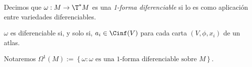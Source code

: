 \begin{ndef}
  Decimos que $\omega: M\to\T^{*}M$ es una \emph{1-forma diferenciable} si lo es como
  aplicación entre variedades diferenciables.
\end{ndef}

\begin{nprop}
  $\omega$ es diferenciable si, y solo si, $a_{i}\in\Cinf(V)$ para cada carta
  $(V,\phi,x_{i})$ de un atlas.
\end{nprop}

Notaremos $\Omega^{1}(M) := \left\{ \omega : \text{$\omega$ es una 1-forma
    diferenciable sobre $M$} \right\}$.